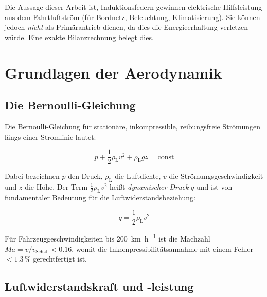 ﻿\documentclass[12pt, a4paper]{report}
\theoremstyle{definition}
\theoremstyle{remark}
\newcommand{\rhoL}{\rho_{\text{L}}}
\begin{document}
Die Aussage dieser Arbeit ist, Induktionsfedern gewinnen elektrische Hilfsleistung aus dem Fahrtluftström (für Bordnetz, Beleuchtung, Klimatisierung). Sie können jedoch \emph{nicht} als Primärantrieb dienen, da dies die Energieerhaltung verletzen würde. Eine exakte Bilanzrechnung belegt dies.

\chapter{Grundlagen der Aerodynamik}
\label{chap:aerodynamik}

\section{Die Bernoulli-Gleichung}

Die Bernoulli-Gleichung für stationäre, inkompressible, reibungsfreie Strömungen
längs einer Stromlinie lautet:

\begin{equation}
  p + \frac{1}{2}\rhoL v^2 + \rhoL g z = \text{const}
  \label{eq:bernoulli}
\end{equation}

Dabei bezeichnen $p$ den Druck, $\rhoL$ die Luftdichte, $v$ die Strömungsgeschwindigkeit
und $z$ die Höhe. Der Term $\frac{1}{2}\rhoL v^2$ heißt \emph{dynamischer Druck}
$q$ und ist von fundamentaler Bedeutung für die Luftwiderstandsbeziehung:

\begin{equation}
  q = \frac{1}{2}\rhoL v^2
  \label{eq:dyn_druck}
\end{equation}

Für Fahrzeuggeschwindigkeiten bis \SI{200}{\kilo\metre\per\hour} ist die
Machzahl $Ma = v/v_{\text{Schall}} < 0.16$, womit die Inkompressibilitäts\-annahme
mit einem Fehler $< 1.3\,\%$ gerechtfertigt ist.

\section{Luftwiderstandskraft und -leistung}
\end{document}
